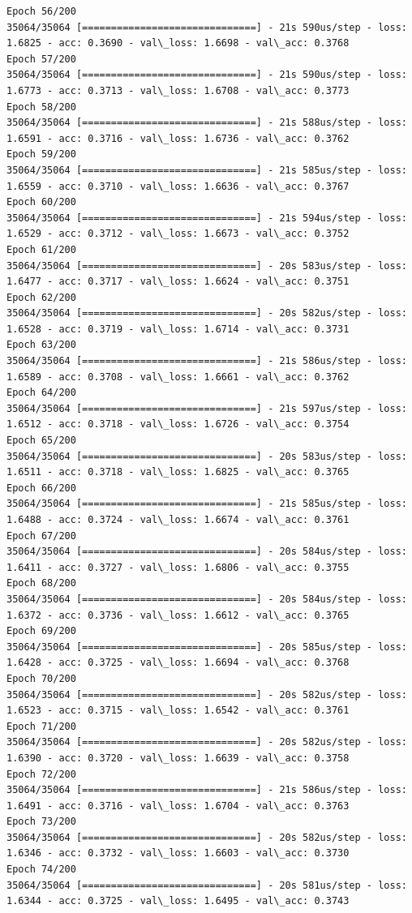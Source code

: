 \documentclass[11pt]{article}
\begin{document}
\begin{Verbatim}[commandchars=\\\{\}]
Epoch 56/200
35064/35064 [==============================] - 21s 590us/step - loss: 1.6825 - acc: 0.3690 - val\_loss: 1.6698 - val\_acc: 0.3768
Epoch 57/200
35064/35064 [==============================] - 21s 590us/step - loss: 1.6773 - acc: 0.3713 - val\_loss: 1.6708 - val\_acc: 0.3773
Epoch 58/200
35064/35064 [==============================] - 21s 588us/step - loss: 1.6591 - acc: 0.3716 - val\_loss: 1.6736 - val\_acc: 0.3762
Epoch 59/200
35064/35064 [==============================] - 21s 585us/step - loss: 1.6559 - acc: 0.3710 - val\_loss: 1.6636 - val\_acc: 0.3767
Epoch 60/200
35064/35064 [==============================] - 21s 594us/step - loss: 1.6529 - acc: 0.3712 - val\_loss: 1.6673 - val\_acc: 0.3752
Epoch 61/200
35064/35064 [==============================] - 20s 583us/step - loss: 1.6477 - acc: 0.3717 - val\_loss: 1.6624 - val\_acc: 0.3751
Epoch 62/200
35064/35064 [==============================] - 20s 582us/step - loss: 1.6528 - acc: 0.3719 - val\_loss: 1.6714 - val\_acc: 0.3731
Epoch 63/200
35064/35064 [==============================] - 21s 586us/step - loss: 1.6589 - acc: 0.3708 - val\_loss: 1.6661 - val\_acc: 0.3762
Epoch 64/200
35064/35064 [==============================] - 21s 597us/step - loss: 1.6512 - acc: 0.3718 - val\_loss: 1.6726 - val\_acc: 0.3754
Epoch 65/200
35064/35064 [==============================] - 20s 583us/step - loss: 1.6511 - acc: 0.3718 - val\_loss: 1.6825 - val\_acc: 0.3765
Epoch 66/200
35064/35064 [==============================] - 21s 585us/step - loss: 1.6488 - acc: 0.3724 - val\_loss: 1.6674 - val\_acc: 0.3761
Epoch 67/200
35064/35064 [==============================] - 20s 584us/step - loss: 1.6411 - acc: 0.3727 - val\_loss: 1.6806 - val\_acc: 0.3755
Epoch 68/200
35064/35064 [==============================] - 20s 584us/step - loss: 1.6372 - acc: 0.3736 - val\_loss: 1.6612 - val\_acc: 0.3765
Epoch 69/200
35064/35064 [==============================] - 20s 585us/step - loss: 1.6428 - acc: 0.3725 - val\_loss: 1.6694 - val\_acc: 0.3768
Epoch 70/200
35064/35064 [==============================] - 20s 582us/step - loss: 1.6523 - acc: 0.3715 - val\_loss: 1.6542 - val\_acc: 0.3761
Epoch 71/200
35064/35064 [==============================] - 20s 582us/step - loss: 1.6390 - acc: 0.3720 - val\_loss: 1.6639 - val\_acc: 0.3758
Epoch 72/200
35064/35064 [==============================] - 21s 586us/step - loss: 1.6491 - acc: 0.3716 - val\_loss: 1.6704 - val\_acc: 0.3763
Epoch 73/200
35064/35064 [==============================] - 20s 582us/step - loss: 1.6346 - acc: 0.3732 - val\_loss: 1.6603 - val\_acc: 0.3730
Epoch 74/200
35064/35064 [==============================] - 20s 581us/step - loss: 1.6344 - acc: 0.3725 - val\_loss: 1.6495 - val\_acc: 0.3743

\end{Verbatim}
\end{document}
